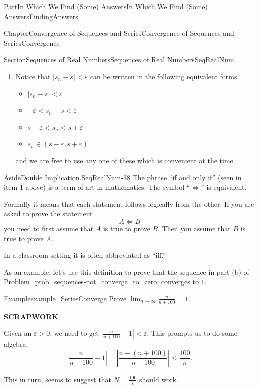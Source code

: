 \documentclass[oneside,10pt,]{book}
\newcommand{\xreffont}{\relax}
\newcommand{\terminology}[1]{\textbf{#1}}
\numberwithin{equation}{part}
\newcommand{\abs}[1]{\left|#1\right|}
\def\limitt#1#2#3{{\displaystyle\lim_{#1\rightarrow #2}\textstyle #3}}
\newcommand{\eps}{\varepsilon}
\newcommand{\lt}{<}
\begin{document}
\begin{partptx}{Part}{In Which We Find (Some) Answers}{}{In Which We Find (Some) Answers}{}{}{FindingAnswers}
\begin{chapterptx}{Chapter}{Convergence of Sequences and Series}{}{Convergence of Sequences and Series}{}{}{Convergence}
\begin{sectionptx}{Section}{Sequences of Real Numbers}{}{Sequences of Real Numbers}{}{}{SeqRealNum}
\begin{enumerate}
\item{}Notice that \(\abs{s_n-s}\lt \eps\) can be written in the following equivalent forms%
\par
%
\begin{itemize}[label=\textbullet]
\item{}\(\displaystyle \abs{s_n-s}\lt \eps\)%
\item{}\(\displaystyle -\eps\lt s_n-s\lt \eps\)%
\item{}\(\displaystyle s-\eps\lt s_n\lt s+\eps\)%
\item{}\(\displaystyle s_n\in\left(s-\eps,s+\eps\right)\)%
\end{itemize}
%
\par
and we are free to use any one of these which is convenient at the time.%
\end{enumerate}
%
\begin{aside}{Aside}{Double Implication.}{SeqRealNum-38}%
The phrase ``if and only if'' (seen in item 1 above) is a term of art in mathematics. The symbol ``\(\Leftrightarrow \)'' is equivalent.%
\par
Formally it means that each statement follows logically from the other. If you are asked to prove the statement%
\begin{equation*}
A\Leftrightarrow B
\end{equation*}
you need to first assume that \(A\) is true to prove \(B\). Then you assume that \(B\) is true to prove \(A\).%
\par
In a classroom setting it is often abbreviated as ``iff.''%
\end{aside}
As an example, let's use this definition to prove that the sequence in part (b) of \hyperref[prob_sequences-not_converge_to_zero]{Problem~{\xreffont\ref{prob_sequences-not_converge_to_zero}}} converges to \(1\).%
\begin{example}{Example}{}{example_SeriesConverge}%
Prove \(\limitt{n}{\infty}{\frac{n}{n+100}}=1\).%
\par
\terminology{SCRAPWORK}%
\par
Given an \(\eps>0\), we need to get \(\abs{\frac{n}{n+100}-1}\lt \eps\). This prompts us to do some algebra.%
\begin{equation*}
\left|\frac{n}{n+100}-1\right|=\left|\frac{n-(n+100)}{n+100}\right|\leq\frac{100}{n}\text{.}
\end{equation*}
%
\par
This in turn, seems to suggest that \(N=\frac{100}{\eps}\) should work.%
\end{example}

\end{sectionptx}
\end{chapterptx}
\end{partptx}
\end{document}
